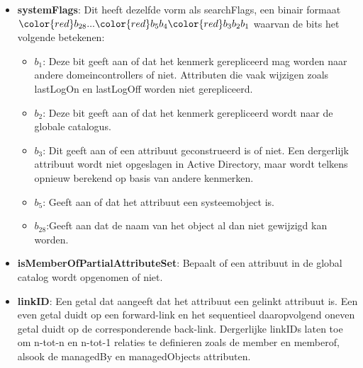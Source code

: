 \documentclass{report}
\begin{document}
\begin{enumerate}
{\begin{itemize}
\begin{itemize}
					\item \textbf{$b_6$}: Deze bit instellen versnelt opzoekingen waarin kenmerken met wildcards vermeld worden. Deze tuple indexen worden best zeldzaam gebruikt, aangezien ze veel resources in beslag nemen.
					\item \textbf{$b_8$}: 
					\item \textbf{$b_{10}$}: 
				\end{itemize}
				\item \textbf{systemFlags}: Dit heeft dezelfde vorm als searchFlags, een binair formaat ${\color{red}b_{28}}...{\color{red}b_{5}}b_{4}{\color{red}b_3b_2b_1}$ waarvan de bits het volgende betekenen:
				\begin{itemize}
					\item \textbf{$b_1$}: Deze bit geeft aan of dat het kenmerk gerepliceerd mag worden naar andere domeincontrollers of niet. Attributen die vaak wijzigen zoals lastLogOn en lastLogOff worden niet gerepliceerd.
					\item \textbf{$b_2$}: Deze bit geeft aan of dat het kenmerk gerepliceerd wordt naar de globale catalogus.
					\item \textbf{$b_3$}: Dit geeft aan of een attribuut geconstrueerd is of niet. Een dergerlijk attribuut wordt niet opgeslagen in Active Directory, maar wordt telkens opnieuw berekend op basis van andere kenmerken.
					\item \textbf{$b_5$}: Geeft aan of dat het attribuut een systeemobject is.
					\item \textbf{$b_{28}$}:Geeft aan dat de naam van het object al dan niet gewijzigd kan worden. 
				\end{itemize}
				\item \textbf{isMemberOfPartialAttributeSet}: Bepaalt of een attribuut in de global catalog wordt opgenomen of niet.
				\item \textbf{linkID}: Een getal dat aangeeft dat het attribuut een gelinkt attribuut is. Een even getal duidt op een forward-link en het sequentieel daaropvolgend oneven getal duidt op de corresponderende back-link. Dergerlijke linkIDs laten toe om n-tot-n en n-tot-1 relaties te definieren zoals de member en memberof, alsook de managedBy en managedObjects attributen. 
			\end{itemize}
		}
		

\end{enumerate}
\end{document}

